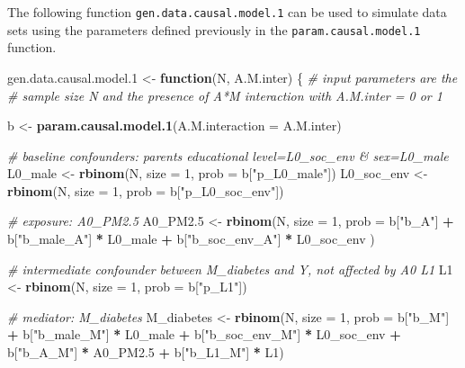 \documentclass[
]{book}
\newenvironment{Shaded}{\begin{snugshade}}{\end{snugshade}}
\newcommand{\AttributeTok}[1]{\textcolor[rgb]{0.13,0.29,0.53}{#1}}
\newcommand{\CommentTok}[1]{\textcolor[rgb]{0.56,0.35,0.01}{\textit{#1}}}
\newcommand{\ControlFlowTok}[1]{\textcolor[rgb]{0.13,0.29,0.53}{\textbf{#1}}}
\newcommand{\DecValTok}[1]{\textcolor[rgb]{0.00,0.00,0.81}{#1}}
\newcommand{\FloatTok}[1]{\textcolor[rgb]{0.00,0.00,0.81}{#1}}
\newcommand{\FunctionTok}[1]{\textcolor[rgb]{0.13,0.29,0.53}{\textbf{#1}}}
\newcommand{\NormalTok}[1]{#1}
\newcommand{\OtherTok}[1]{\textcolor[rgb]{0.56,0.35,0.01}{#1}}
\newcommand{\SpecialCharTok}[1]{\textcolor[rgb]{0.81,0.36,0.00}{\textbf{#1}}}
\newcommand{\StringTok}[1]{\textcolor[rgb]{0.31,0.60,0.02}{#1}}
\begin{document}
The following function \texttt{gen.data.causal.model.1} can be used to simulate data sets using the parameters defined previously in the \texttt{param.causal.model.1} function.

\begin{Shaded}
\begin{Highlighting}[]
\NormalTok{gen.data.causal.model}\FloatTok{.1} \OtherTok{\textless{}{-}} \ControlFlowTok{function}\NormalTok{(N, A.M.inter) \{ }\CommentTok{\# input parameters are the }
  \CommentTok{\#   sample size N and the presence of A*M interaction with A.M.inter = 0 or 1}
  
\NormalTok{  b }\OtherTok{\textless{}{-}} \FunctionTok{param.causal.model.1}\NormalTok{(}\AttributeTok{A.M.interaction =}\NormalTok{ A.M.inter)}
    
  \CommentTok{\# baseline confounders: parent\textquotesingle{}s educational level=L0\_soc\_env \& sex=L0\_male}
\NormalTok{  L0\_male }\OtherTok{\textless{}{-}} \FunctionTok{rbinom}\NormalTok{(N, }\AttributeTok{size =} \DecValTok{1}\NormalTok{, }\AttributeTok{prob =}\NormalTok{ b[}\StringTok{"p\_L0\_male"}\NormalTok{]) }
\NormalTok{  L0\_soc\_env }\OtherTok{\textless{}{-}} \FunctionTok{rbinom}\NormalTok{(N, }\AttributeTok{size =} \DecValTok{1}\NormalTok{, }\AttributeTok{prob =}\NormalTok{ b[}\StringTok{"p\_L0\_soc\_env"}\NormalTok{])  }
  
  \CommentTok{\# exposure: A0\_PM2.5}
\NormalTok{  A0\_PM2}\FloatTok{.5} \OtherTok{\textless{}{-}} \FunctionTok{rbinom}\NormalTok{(N, }\AttributeTok{size =} \DecValTok{1}\NormalTok{, }\AttributeTok{prob =}\NormalTok{  b[}\StringTok{"b\_A"}\NormalTok{] }\SpecialCharTok{+} 
\NormalTok{                     b[}\StringTok{"b\_male\_A"}\NormalTok{] }\SpecialCharTok{*}\NormalTok{ L0\_male }\SpecialCharTok{+} 
\NormalTok{                     b[}\StringTok{"b\_soc\_env\_A"}\NormalTok{] }\SpecialCharTok{*}\NormalTok{ L0\_soc\_env ) }
  
  \CommentTok{\# intermediate confounder between M\_diabetes and Y, not affected by A0 L1}
\NormalTok{  L1 }\OtherTok{\textless{}{-}} \FunctionTok{rbinom}\NormalTok{(N, }\AttributeTok{size =} \DecValTok{1}\NormalTok{, }\AttributeTok{prob =}\NormalTok{ b[}\StringTok{"p\_L1"}\NormalTok{])}
  
  \CommentTok{\# mediator: M\_diabetes}
\NormalTok{  M\_diabetes }\OtherTok{\textless{}{-}} \FunctionTok{rbinom}\NormalTok{(N, }\AttributeTok{size =} \DecValTok{1}\NormalTok{, }\AttributeTok{prob =}\NormalTok{ b[}\StringTok{"b\_M"}\NormalTok{] }\SpecialCharTok{+} 
\NormalTok{                        b[}\StringTok{"b\_male\_M"}\NormalTok{] }\SpecialCharTok{*}\NormalTok{ L0\_male }\SpecialCharTok{+} 
\NormalTok{                        b[}\StringTok{"b\_soc\_env\_M"}\NormalTok{] }\SpecialCharTok{*}\NormalTok{ L0\_soc\_env }\SpecialCharTok{+} 
\NormalTok{                        b[}\StringTok{"b\_A\_M"}\NormalTok{] }\SpecialCharTok{*}\NormalTok{ A0\_PM2}\FloatTok{.5} \SpecialCharTok{+}
\NormalTok{                        b[}\StringTok{"b\_L1\_M"}\NormalTok{] }\SpecialCharTok{*}\NormalTok{ L1) }


\end{Highlighting}
\end{Shaded}
\end{document}
